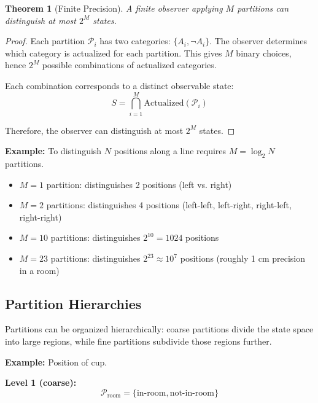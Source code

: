 \documentclass[twocolumn,10pt]{article}
\newtheorem{theorem}{Theorem}[section]
\theoremstyle{definition}
\theoremstyle{remark}
\begin{document}
\begin{theorem}[Finite Precision]
\label{thm:finite_precision}
A finite observer applying $M$ partitions can distinguish at most $2^M$ states.
\end{theorem}

\begin{proof}
Each partition $\mathcal{P}_i$ has two categories: $\{A_i, \neg A_i\}$. The observer determines which category is actualized for each partition. This gives $M$ binary choices, hence $2^M$ possible combinations of actualized categories.

Each combination corresponds to a distinct observable state:
\begin{equation}
S = \bigcap_{i=1}^{M} \text{Actualized}(\mathcal{P}_i)
\end{equation}

Therefore, the observer can distinguish at most $2^M$ states.
\end{proof}

\noindent\textbf{Example:} To distinguish $N$ positions along a line requires $M = \log_2 N$ partitions.
\begin{itemize}
\item $M = 1$ partition: distinguishes 2 positions (left vs. right)
\item $M = 2$ partitions: distinguishes 4 positions (left-left, left-right, right-left, right-right)
\item $M = 10$ partitions: distinguishes $2^{10} = 1024$ positions
\item $M = 23$ partitions: distinguishes $2^{23} \approx 10^7$ positions (roughly 1 cm precision in a room)
\end{itemize}

\subsection{Partition Hierarchies}

Partitions can be organized hierarchically: coarse partitions divide the state space into large regions, while fine partitions subdivide those regions further.

\vspace{0.2cm}
\noindent\textbf{Example:} Position of cup.

\textbf{Level 1 (coarse):}
\begin{equation}
\mathcal{P}_{\text{room}} = \{\text{in-room}, \text{not-in-room}\}
\end{equation}
\end{document}
